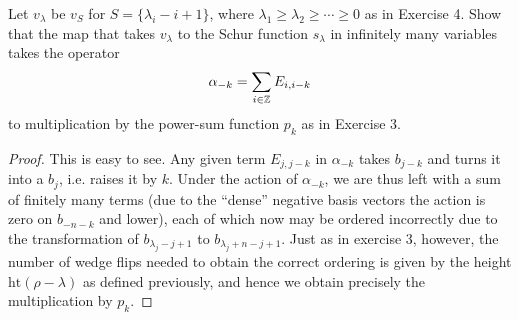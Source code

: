 \documentclass{../../mathnotes}
\begin{document}
\begin{exc}
    Let $v_\lambda$ be $v_S$ for $S=\{\lambda_i-i+1\}$, where $\lambda_1\geq\lambda_2\geq\cdots\geq 0$ as
    in Exercise 4. Show that the map that takes $v_\lambda$ to the Schur function $s_\lambda$ in infinitely
    many variables takes the operator
    \[\alpha_{-k}=\sum_{i\in\mathbb{Z}}E_{i,i-k}\]
    to multiplication by the power-sum function $p_k$ as in Exercise 3.
\end{exc}
\begin{proof}
    This is easy to see. Any given term $E_{j,j-k}$ in $\alpha_{-k}$ takes $b_{j-k}$ and turns
    it into a $b_{j}$, i.e. raises it by $k$. Under the action of $\alpha_{-k}$, we are thus left
    with a sum of finitely many terms (due to the ``dense'' negative basis vectors the action is zero
    on $b_{-n-k}$ and lower), each of which now may
    be ordered incorrectly due to the transformation of $b_{\lambda_j-j+1}$ to $b_{\lambda_j+n-j+1}$. Just
    as in exercise 3, however, the number of wedge flips needed to obtain the correct ordering is given
    by the height $\text{ht}(\rho-\lambda)$ as defined previously, and hence we obtain precisely the multiplication
    by $p_k$.
\end{proof}
\end{document}
